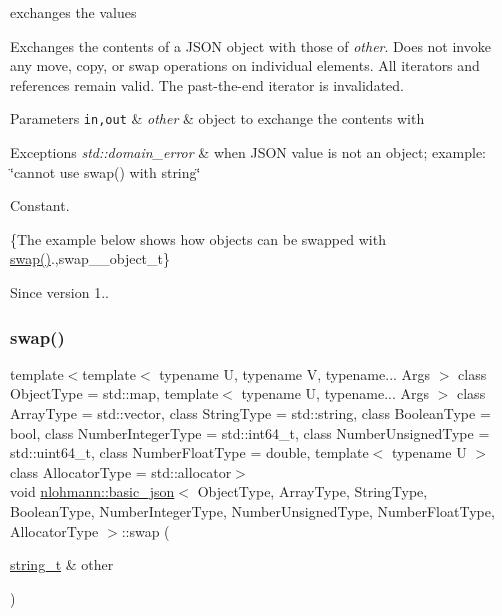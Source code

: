 exchanges the values 

Exchanges the contents of a J\+S\+ON object with those of {\itshape other}. Does not invoke any move, copy, or swap operations on individual elements. All iterators and references remain valid. The past-\/the-\/end iterator is invalidated.


\begin{DoxyParams}[1]{Parameters}
\mbox{\tt in,out}  & {\em other} & object to exchange the contents with\\
\hline
\end{DoxyParams}

\begin{DoxyExceptions}{Exceptions}
{\em std\+::domain\+\_\+error} & when J\+S\+ON value is not an object; example\+: {\ttfamily \char`\"{}cannot use swap() with string\char`\"{}}\\
\hline
\end{DoxyExceptions}
Constant.

\{The example below shows how objects can be swapped with {\ttfamily \hyperlink{classnlohmann_1_1basic__json_a2f774129440c427253dc97406e2d9010}{swap()}}.,swap\+\_\+\+\_\+object\+\_\+t\}

\begin{DoxySince}{Since}
version 1.. 
\end{DoxySince}
\hypertarget{classnlohmann_1_1basic__json_a86089c703a2e563b9f760c2f8408efa7}{}\label{classnlohmann_1_1basic__json_a86089c703a2e563b9f760c2f8408efa7} 
\subsubsection{\texorpdfstring{swap()}{swap()}\hspace{0.1cm}{\footnotesize\ttfamily [4/4]}}
{\footnotesize\ttfamily template$<$template$<$ typename U, typename V, typename... Args $>$ class Object\+Type = std\+::map, template$<$ typename U, typename... Args $>$ class Array\+Type = std\+::vector, class String\+Type  = std\+::string, class Boolean\+Type  = bool, class Number\+Integer\+Type  = std\+::int64\+\_\+t, class Number\+Unsigned\+Type  = std\+::uint64\+\_\+t, class Number\+Float\+Type  = double, template$<$ typename U $>$ class Allocator\+Type = std\+::allocator$>$ \\
void \hyperlink{classnlohmann_1_1basic__json}{nlohmann\+::basic\+\_\+json}$<$ Object\+Type, Array\+Type, String\+Type, Boolean\+Type, Number\+Integer\+Type, Number\+Unsigned\+Type, Number\+Float\+Type, Allocator\+Type $>$\+::swap (\begin{DoxyParamCaption}\item[{\hyperlink{classnlohmann_1_1basic__json_ab63e618bbb0371042b1bec17f5891f42}{string\+\_\+t} \&}]{other }\end{DoxyParamCaption})\hspace{0.3cm}{\ttfamily [inline]}}



